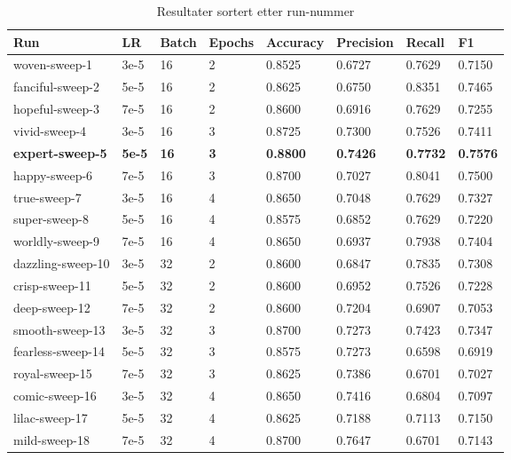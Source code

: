 \begin{table}
\caption{Resultater sortert etter run-nummer}
\label{tab:results}
\begin{tabular}{llllllll}
\toprule
Run & LR & Batch & Epochs & Accuracy & Precision & Recall & F1 \\
\midrule
woven-sweep-1 & 3e-5 & 16 & 2 & 0.8525 & 0.6727 & 0.7629 & 0.7150 \\
fanciful-sweep-2 & 5e-5 & 16 & 2 & 0.8625 & 0.6750 & 0.8351 & 0.7465 \\
hopeful-sweep-3 & 7e-5 & 16 & 2 & 0.8600 & 0.6916 & 0.7629 & 0.7255 \\
vivid-sweep-4 & 3e-5 & 16 & 3 & 0.8725 & 0.7300 & 0.7526 & 0.7411 \\
\textbf{expert-sweep-5} & \textbf{5e-5} & \textbf{16} & \textbf{3} & \textbf{0.8800} & \textbf{0.7426} & \textbf{0.7732} & \textbf{0.7576} \\
happy-sweep-6 & 7e-5 & 16 & 3 & 0.8700 & 0.7027 & 0.8041 & 0.7500 \\
true-sweep-7 & 3e-5 & 16 & 4 & 0.8650 & 0.7048 & 0.7629 & 0.7327 \\
super-sweep-8 & 5e-5 & 16 & 4 & 0.8575 & 0.6852 & 0.7629 & 0.7220 \\
worldly-sweep-9 & 7e-5 & 16 & 4 & 0.8650 & 0.6937 & 0.7938 & 0.7404 \\
dazzling-sweep-10 & 3e-5 & 32 & 2 & 0.8600 & 0.6847 & 0.7835 & 0.7308 \\
crisp-sweep-11 & 5e-5 & 32 & 2 & 0.8600 & 0.6952 & 0.7526 & 0.7228 \\
deep-sweep-12 & 7e-5 & 32 & 2 & 0.8600 & 0.7204 & 0.6907 & 0.7053 \\
smooth-sweep-13 & 3e-5 & 32 & 3 & 0.8700 & 0.7273 & 0.7423 & 0.7347 \\
fearless-sweep-14 & 5e-5 & 32 & 3 & 0.8575 & 0.7273 & 0.6598 & 0.6919 \\
royal-sweep-15 & 7e-5 & 32 & 3 & 0.8625 & 0.7386 & 0.6701 & 0.7027 \\
comic-sweep-16 & 3e-5 & 32 & 4 & 0.8650 & 0.7416 & 0.6804 & 0.7097 \\
lilac-sweep-17 & 5e-5 & 32 & 4 & 0.8625 & 0.7188 & 0.7113 & 0.7150 \\
mild-sweep-18 & 7e-5 & 32 & 4 & 0.8700 & 0.7647 & 0.6701 & 0.7143 \\
\bottomrule
\end{tabular}
\end{table}

